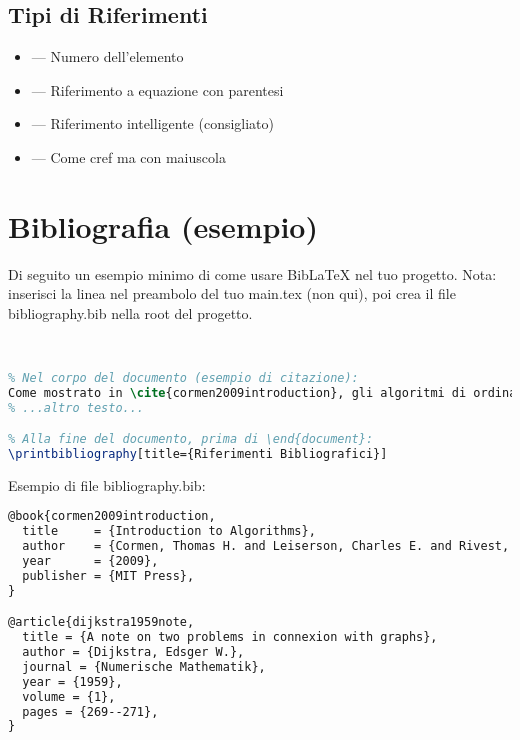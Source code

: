 \documentclass{csnotes}
\begin{document}
\subsection{Tipi di Riferimenti}

\begin{itemize}
    \item {} --- Numero dell'elemento
    \item {} --- Riferimento a equazione con parentesi
    \item {} --- Riferimento intelligente (consigliato)
    \item {} --- Come cref ma con maiuscola
\end{itemize}


\section{Bibliografia (esempio)}

Di seguito un esempio minimo di come usare BibLaTeX nel tuo progetto.  
Nota: inserisci la linea \verb|| nel preambolo del tuo main.tex (non qui), poi crea il file bibliography.bib nella root del progetto.

\begin{lstlisting}[language=TeX]
% Nel preambolo del main.tex:


% Nel corpo del documento (esempio di citazione):
Come mostrato in \cite{cormen2009introduction}, gli algoritmi di ordinamento...
% ...altro testo...

% Alla fine del documento, prima di \end{document}:
\printbibliography[title={Riferimenti Bibliografici}]
\end{lstlisting}

Esempio di file bibliography.bib:

\begin{lstlisting}[language=TeX, caption=Esempio file bibliography.bib]
@book{cormen2009introduction,
  title     = {Introduction to Algorithms},
  author    = {Cormen, Thomas H. and Leiserson, Charles E. and Rivest, Ronald L. and Stein, Clifford},
  year      = {2009},
  publisher = {MIT Press},
}

@article{dijkstra1959note,
  title = {A note on two problems in connexion with graphs},
  author = {Dijkstra, Edsger W.},
  journal = {Numerische Mathematik},
  year = {1959},
  volume = {1},
  pages = {269--271},
}
\end{lstlisting}
\end{document}

